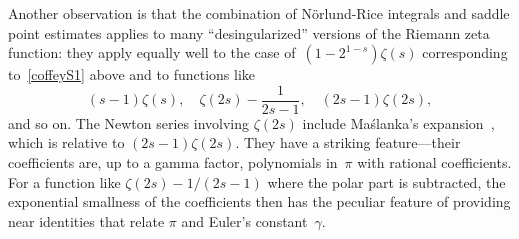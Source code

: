 \documentclass{amsart}
\begin{document}
Another observation is that the combination of N\"orlund-Rice integrals
and saddle point estimates applies to many ``desingularized'' versions of 
the Riemann zeta function: they apply equally well to
the case of~$(1-2^{1-s})\zeta(s)$ corresponding to~\eqref{coffeyS1} above
and to functions like
\[
(s-1)\zeta(s), \quad
\zeta(2s)-\frac{1}{2s-1},\quad
(2s-1)\zeta(2s),
\]
and so on. The 
Newton series involving $\zeta(2s)$ include Ma{\'s}lanka's expansion~\cite{Maslanka01}, which is
relative to $(2s-1)\zeta(2s)$.
They have a striking feature---their coefficients are, up to a gamma factor,
polynomials in~$\pi$ with rational coefficients. 
For a function like $\zeta(2s)-1/(2s-1)$ where the polar part is subtracted,
the exponential smallness of the coefficients
then has the peculiar feature of providing near identities that relate $\pi$ and
Euler's constant~$\gamma$.








\end{document}
